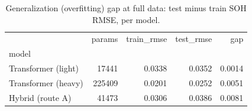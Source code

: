 \begin{table}
\caption{Generalization (overfitting) gap at full data: test minus train SOH RMSE, per model.}
\label{tab:ablation_overfitting_gap}
\begin{tabular}{lrrrr}
\toprule
 & params & train\_rmse & test\_rmse & gap \\
model &  &  &  &  \\
\midrule
Transformer (light) & 17441 & 0.0338 & 0.0352 & 0.0014 \\
Transformer (heavy) & 225409 & 0.0201 & 0.0252 & 0.0051 \\
Hybrid (route A) & 41473 & 0.0306 & 0.0386 & 0.0081 \\
\bottomrule
\end{tabular}
\end{table}

